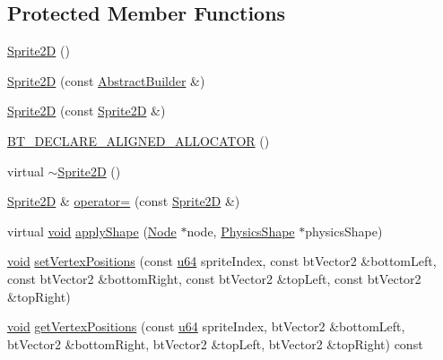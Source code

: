 \subsection*{Protected Member Functions}
\begin{DoxyCompactItemize}
\item 
\mbox{\hyperlink{classnjli_1_1_sprite2_d_ae1afa39b1a31b063b987d75cb2cebb9b}{Sprite2D}} ()
\item 
\mbox{\hyperlink{classnjli_1_1_sprite2_d_a0f243b6919f6ce210a53dbf5429b1609}{Sprite2D}} (const \mbox{\hyperlink{classnjli_1_1_abstract_builder}{Abstract\+Builder}} \&)
\item 
\mbox{\hyperlink{classnjli_1_1_sprite2_d_ae9006247411dd22ca34f98cfe3f54f0c}{Sprite2D}} (const \mbox{\hyperlink{classnjli_1_1_sprite2_d}{Sprite2D}} \&)
\item 
\mbox{\hyperlink{classnjli_1_1_sprite2_d_a5ad2cf93a7f76fa359afeee9b4b7cccf}{B\+T\+\_\+\+D\+E\+C\+L\+A\+R\+E\+\_\+\+A\+L\+I\+G\+N\+E\+D\+\_\+\+A\+L\+L\+O\+C\+A\+T\+OR}} ()
\item 
virtual \mbox{\hyperlink{classnjli_1_1_sprite2_d_af0fcfd6f7e33f5147bd0d2749af11071}{$\sim$\+Sprite2D}} ()
\item 
\mbox{\hyperlink{classnjli_1_1_sprite2_d}{Sprite2D}} \& \mbox{\hyperlink{classnjli_1_1_sprite2_d_a37931c43c6f6cd71930c4c09186742ef}{operator=}} (const \mbox{\hyperlink{classnjli_1_1_sprite2_d}{Sprite2D}} \&)
\item 
virtual \mbox{\hyperlink{_thread_8h_af1e856da2e658414cb2456cb6f7ebc66}{void}} \mbox{\hyperlink{classnjli_1_1_sprite2_d_ae5133dcfd1e31e9686c1240e86feb7d4}{apply\+Shape}} (\mbox{\hyperlink{classnjli_1_1_node}{Node}} $\ast$node, \mbox{\hyperlink{classnjli_1_1_physics_shape}{Physics\+Shape}} $\ast$physics\+Shape)
\item 
\mbox{\hyperlink{_thread_8h_af1e856da2e658414cb2456cb6f7ebc66}{void}} \mbox{\hyperlink{classnjli_1_1_sprite2_d_a1eb18ee4456f637f49d4f8af92c26d21}{set\+Vertex\+Positions}} (const \mbox{\hyperlink{_util_8h_ad758b7a5c3f18ed79d2fcd23d9f16357}{u64}} sprite\+Index, const bt\+Vector2 \&bottom\+Left, const bt\+Vector2 \&bottom\+Right, const bt\+Vector2 \&top\+Left, const bt\+Vector2 \&top\+Right)
\item 
\mbox{\hyperlink{_thread_8h_af1e856da2e658414cb2456cb6f7ebc66}{void}} \mbox{\hyperlink{classnjli_1_1_sprite2_d_a51e7da9615ab1a4896eb0a7d6a26dc33}{get\+Vertex\+Positions}} (const \mbox{\hyperlink{_util_8h_ad758b7a5c3f18ed79d2fcd23d9f16357}{u64}} sprite\+Index, bt\+Vector2 \&bottom\+Left, bt\+Vector2 \&bottom\+Right, bt\+Vector2 \&top\+Left, bt\+Vector2 \&top\+Right) const

\end{DoxyCompactItemize}
